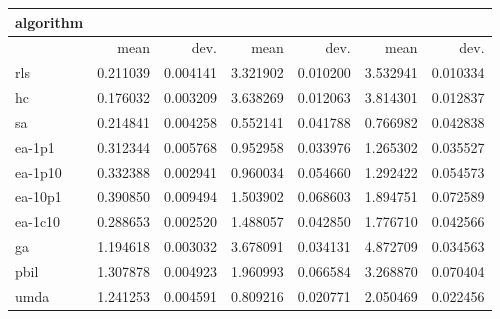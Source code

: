 \begin{tabular}{@{}l*{6}{>{{}}N{1}{2}}@{}}
\toprule
{algorithm} &  &  &  \\
\midrule
& {mean} & {dev.} & {mean} & {dev.} & {mean} & {dev.} \\
\midrule
rls & 0.211039 & 0.004141 & 3.321902 & 0.010200 & 3.532941 & 0.010334 \\
 hc & 0.176032 & 0.003209 & 3.638269 & 0.012063 & 3.814301 & 0.012837 \\
 sa & 0.214841 & 0.004258 & 0.552141 & 0.041788 & 0.766982 & 0.042838 \\
 ea-1p1 & 0.312344 & 0.005768 & 0.952958 & 0.033976 & 1.265302 & 0.035527 \\
 ea-1p10 & 0.332388 & 0.002941 & 0.960034 & 0.054660 & 1.292422 & 0.054573 \\
 ea-10p1 & 0.390850 & 0.009494 & 1.503902 & 0.068603 & 1.894751 & 0.072589 \\
 ea-1c10 & 0.288653 & 0.002520 & 1.488057 & 0.042850 & 1.776710 & 0.042566 \\
 ga & 1.194618 & 0.003032 & 3.678091 & 0.034131 & 4.872709 & 0.034563 \\
 pbil & 1.307878 & 0.004923 & 1.960993 & 0.066584 & 3.268870 & 0.070404 \\
 umda & 1.241253 & 0.004591 & 0.809216 & 0.020771 & 2.050469 & 0.022456 \\
 \bottomrule
\end{tabular}
